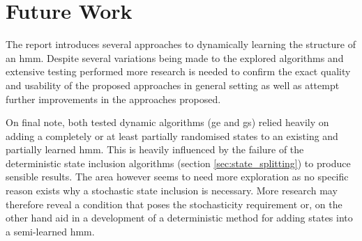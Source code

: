 \chapter{Future Work}
\label{chap:future_work}
The report introduces several approaches to dynamically learning the structure of an \gls{hmm}. Despite several variations being made to the explored algorithms and extensive testing performed more research is needed to confirm the exact quality and usability of the proposed approaches in general setting as well as attempt further improvements in the approaches proposed.

On final note, both tested dynamic algorithms (\acrlong{ge} and \acrlong{gs}) relied heavily on adding a completely or at least partially randomised states to an existing and partially learned \gls{hmm}. This is heavily influenced by the failure of the deterministic state inclusion algorithms (section \ref{sec:state_splitting}) to produce sensible results. The area however seems to need more exploration as no specific reason exists why a stochastic state inclusion is necessary. More research may therefore reveal a condition that poses the stochasticity requirement or, on the other hand aid in a development of a deterministic method for adding states into a semi-learned \gls{hmm}.


